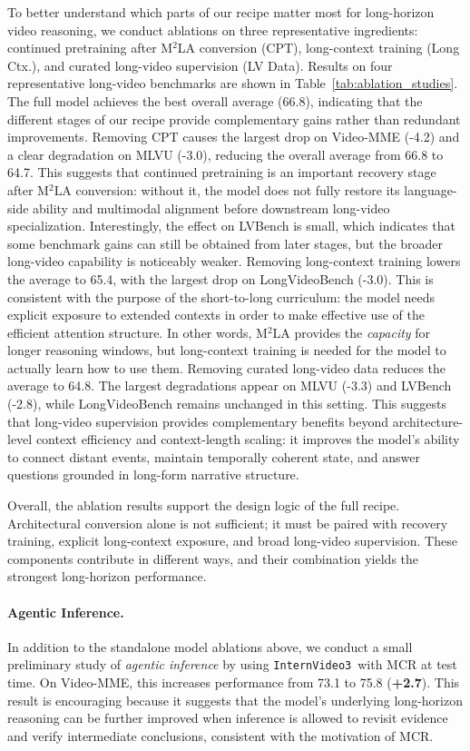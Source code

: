 \documentclass[11pt, letterpaper]{template}
\theoremstyle{plain}
\theoremstyle{definition}
\theoremstyle{remark}
\newcommand{\name}{\texttt{InternVideo3}\xspace}
\begin{document}
To better understand which parts of our recipe matter most for long-horizon video reasoning, we conduct ablations on three representative ingredients: continued pretraining after M$^2$LA conversion (CPT), long-context training (Long Ctx.), and curated long-video supervision (LV Data). Results on four representative long-video benchmarks are shown in Table~\ref{tab:ablation_studies}.
The full model achieves the best overall average (66.8), indicating that the different stages of our recipe provide complementary gains rather than redundant improvements.
Removing CPT causes the largest drop on Video-MME (-4.2) and a clear degradation on MLVU (-3.0), reducing the overall average from 66.8 to 64.7. This suggests that continued pretraining is an important recovery stage after M$^2$LA conversion: without it, the model does not fully restore its language-side ability and multimodal alignment before downstream long-video specialization. Interestingly, the effect on LVBench is small, which indicates that some benchmark gains can still be obtained from later stages, but the broader long-video capability is noticeably weaker.
Removing long-context training lowers the average to 65.4, with the largest drop on LongVideoBench (-3.0). This is consistent with the purpose of the short-to-long curriculum: the model needs explicit exposure to extended contexts in order to make effective use of the efficient attention structure. In other words, M$^2$LA provides the \emph{capacity} for longer reasoning windows, but long-context training is needed for the model to actually learn how to use them.
Removing curated long-video data reduces the average to 64.8. The largest degradations appear on MLVU (-3.3) and LVBench (-2.8), while LongVideoBench remains unchanged in this setting. This suggests that long-video supervision provides complementary benefits beyond architecture-level context efficiency and context-length scaling: it improves the model's ability to connect distant events, maintain temporally coherent state, and answer questions grounded in long-form narrative structure.

Overall, the ablation results support the design logic of the full recipe. Architectural conversion alone is not sufficient; it must be paired with recovery training, explicit long-context exposure, and broad long-video supervision. These components contribute in different ways, and their combination yields the strongest long-horizon performance.

\paragraph{Agentic Inference.} In addition to the standalone model ablations above, we conduct a small preliminary study of \emph{agentic inference} by using \name\ with MCR at test time. On Video-MME, this increases performance from 73.1 to 75.8 (\textbf{+2.7}). This result is encouraging because it suggests that the model's underlying long-horizon reasoning can be further improved when inference is allowed to revisit evidence and verify intermediate conclusions, consistent with the motivation of MCR.
\end{document}
